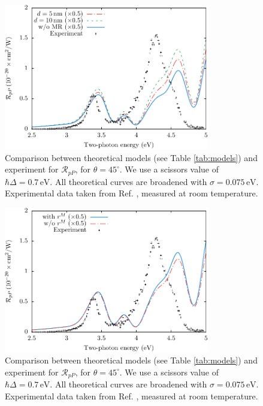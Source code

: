 \documentclass[11pt]{book}
\begin{document}
\begin{figure}
\centering
\includegraphics[width=0.8\textwidth]{../figures/04-results/fig-4_4_12}
\caption{Comparison between theoretical models (see Table
\ref{tab:models}) and experiment for $\mathcal{R}_{pP}$, for
$\theta=45^{\circ}$. We use a scissors value of $\hbar\Delta = 0.7\,\text{eV}$.
All theoretical curves are broadened with $\sigma=0.075\,\text{eV}$.
Experimental data taken from Ref. \cite{mitchellSS01}, measured at room
temperature.}
\label{fig:mr1}
\end{figure}

\begin{figure}
\centering
\includegraphics[width=0.8\textwidth]{../figures/04-results/fig-4_4_13}
\caption{Comparison between theoretical models (see Table
\ref{tab:models}) and experiment for $\mathcal{R}_{pP}$, for
$\theta=45^{\circ}$. We use a scissors value of $\hbar\Delta = 0.7\,\text{eV}$.
All theoretical curves are broadened with $\sigma=0.075\,\text{eV}$.
Experimental data taken from Ref. \cite{mitchellSS01}, measured at room
temperature.}
\label{fig:mr2}
\end{figure}
\end{document}
